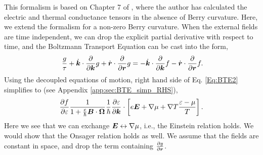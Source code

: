 \documentclass{report}
\renewcommand\vec[1]{\ensuremath\boldsymbol{#1}} %
\begin{document}
This formalism is based on Chapter 7 of \cite{book:ZimanSolidState}, where the author has calculated the electric and thermal conductance tensors in the absence of Berry curvature. Here, we extend the formalism for a non-zero Berry curvature. When the external fields are time independent, we can drop the explicit partial derivative with respect to time, and the Boltzmann Transport Equation can be cast into the form,
\begin{equation}~\label{Eq:BTE2}
	\frac{g}{\tau} + \dot{\vec{k}}\cdot\frac{\partial}{\partial \vec{k}} g + \dot{\vec{r}}\cdot\frac{\partial}{\partial \vec{r}} g = -\dot{\vec{k}}\cdot\frac{\partial}{\partial \vec{k}}f - \dot{\vec{r}}\cdot\frac{\partial}{\partial \vec{r}}f.
\end{equation}
Using the decoupled equations of motion, right hand side of Eq. \eqref{Eq:BTE2} simplifies to (see Appendix \ref{app:sec:BTE_simp_RHS}),
$$\frac{\partial f}{\partial \varepsilon}\frac{1}{1 + \frac{e}{\hbar} \vec{B}\cdot\vec{\Omega}}
\frac{1}{\hbar} \frac{\partial \varepsilon}{\partial \vec{k}}\cdot\left[e \vec{E} + \nabla{\mu} + \nabla T \frac{\varepsilon - \mu}{T}\right] .
$$
Here we see that we can exchange $\vec{E} \leftrightarrow \nabla \mu$, i.e., the Einstein relation holds. We would show that the Onsager relation holds as well.
We assume that the fields are constant in space, and drop the term containing $\frac{\partial{g}}{\partial \vec{r}}$.
\end{document}
